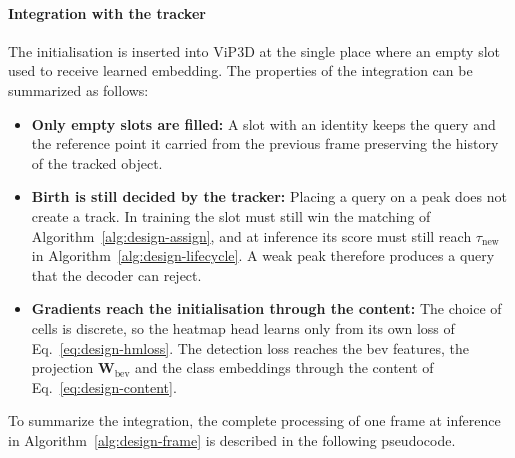 \paragraph{Integration with the tracker}
\label{subsec:design-integration}

The initialisation is inserted into ViP3D at the single place where an empty slot used to receive learned embedding. 
The properties of the integration can be summarized as follows:

\begin{itemize}
    \item \textbf{Only empty slots are filled:} A slot with an identity keeps the query and the reference
    point it carried from the previous frame preserving the history of the tracked object.
    \item \textbf{Birth is still decided by the tracker:} Placing a query on a peak does not create a track.
    In training the slot must still win the matching of Algorithm~\ref{alg:design-assign}, and at inference
    its score must still reach $\tau_{\mathrm{new}}$ in Algorithm~\ref{alg:design-lifecycle}. A weak peak
    therefore produces a query that the decoder can reject.
    \item \textbf{Gradients reach the initialisation through the content:} The choice of cells is
    discrete, so the heatmap head learns only from its own loss of Eq.~\eqref{eq:design-hmloss}. The
    detection loss reaches the \ac{bev} features, the projection $\mathbf{W}_{\mathrm{bev}}$ and the class
    embeddings through the content of Eq.~\eqref{eq:design-content}.
\end{itemize}

To summarize the integration, the complete processing of one frame at inference in Algorithm~\ref{alg:design-frame}
is described in the following pseudocode.

